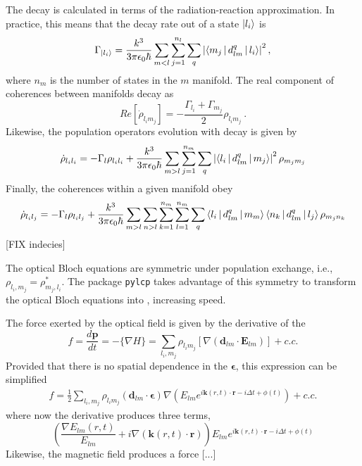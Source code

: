 \documentclass[final,5p,times,twocolumn]{elsarticle}
\newcounter{bla}
\begin{document}
The decay is calculated in terms of the radiation-reaction approximation.  In practice, this means that the decay rate out of a state $\ket{l_i}$ is
\begin{equation}
    \Gamma_{\ket{l_i}} = \frac{k^3}{3\pi\epsilon_0\hbar}\sum_{m<l}\sum_{j=1}^{n_l}\sum_q \left|\Braket{m_j|d_{lm}^{q}|l_i}\right|^2,
\end{equation}
where $n_m$ is the number of states in the $m$ manifold.  The real component of coherences between manifolds decay as
\begin{equation}
	Re[\dot{\rho}_{l_im_j}] = -\frac{\Gamma_{l_i}+\Gamma_{m_j}}{2}\rho_{l_im_j}\ .
\end{equation}
Likewise, the population operators evolution with decay is given by
\begin{equation}
	\dot{\rho}_{l_il_i} = -\Gamma_l\rho_{l_il_i} + \frac{k^3}{3\pi\epsilon_0\hbar}\sum_{m>l}\sum_{j=1}^{n_m}\sum_q \left|\Braket{l_i|d_{lm}^{q}|m_j}\right|^2 \rho_{m_jm_j}
\end{equation}
Finally, the coherences within a given manifold obey
\begin{equation}
	\dot{\rho}_{l_il_j} = -\Gamma_l\rho_{l_il_j} + \frac{k^3}{3\pi\epsilon_0\hbar}\sum_{m>l}\sum_{n>l}\sum_{k=1}^{n_m}\sum_{l=1}^{n_m}\sum_q \Braket{l_i|d_{lm}^{q}|m_m}\Braket{n_k|d_{lm}^{q}|l_j}\rho_{m_jn_k}
\end{equation}
[FIX indecies]

The optical Bloch equations are symmetric under population exchange, i.e., $\rho_{l_i, m_j} = \rho^*_{m_j, l_i}$.  The package {\tt pylcp} takes advantage of this symmetry to transform the optical Bloch equations into , increasing speed.

The force exerted by the optical field is given by the derivative of the
\begin{equation}
	f = \frac{d\mathbf{p}}{dt} = -\{\nabla H\} = \sum_{l_i,m_j} \rho_{l_im_j}\left[\nabla(\boldsymbol{d}_{lm}\cdot \mathbf{E}_{lm})\right] + c.c.
\end{equation}
Provided that there is no spatial dependence in the $\boldsymbol{\epsilon}$, this expression can be simplified
\begin{eqnarray}
	f = \frac{1}{2}\sum_{l_i,m_j} \rho_{l_im_j}\left(\boldsymbol{d}_{lm}\cdot \boldsymbol{\epsilon}\right) \nabla \left(E_{lm}e^{i\mathbf{k}(r,t)\cdot\mathbf{r}-i \Delta t + \phi(t)}\right) + c.c.
\end{eqnarray}
where now the derivative produces three terms,
\begin{equation}
	\left(\frac{\nabla E_{lm}(r,t)}{E_{lm}} + i \nabla (\mathbf{k}(r,t)\cdot \mathbf{r})\right)E_{lm}e^{i\mathbf{k}(r,t)\cdot\mathbf{r}-i \Delta t + \phi(t)}
\end{equation}
Likewise, the magnetic field produces a force [...]
\end{document}
